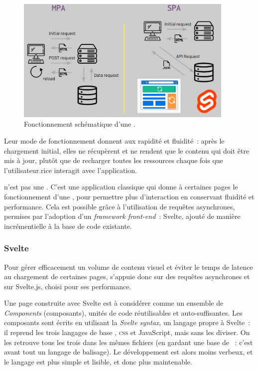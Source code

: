         \begin{figure}[H]
          \begin{center}
          \includegraphics[height=6cm]{figues/SPA.png}
          \end{center}
          \caption{Fonctionnement schématique d'une \spa.}
          \label{fig:spa} \end{figure}

Leur mode de fonctionnement donnent aux \spa rapidité et fluidité~: après
le chargement initial, elles ne récupèrent et ne rendent que le contenu
qui doit être mis à jour, plutôt que de recharger toutes les ressources
chaque fois que l'utilisateur.rice interagit avec l'application.

\aikon n'est pas une \spa. C'est une application classique qui donne à
certaines pages le fonctionnement d'une \spa, pour permettre plus
d'interaction en conservant fluidité et performance. Cela est possible
grâce à l'utilisation de requêtes asynchrones, permises par l'adoption
d'un \textit{framework front-end}~: Svelte, ajouté de manière incrémentielle à la
base de code existante.

\hypertarget{svelte}{%
\subsubsection{Svelte}\label{svelte}}

Pour gérer efficacement un volume de contenu visuel et éviter le temps
de latence au chargement de certaines pages, \aikon s'appuie donc sur des
requêtes asynchrones et sur Svelte.js, choisi pour ses performance.

Une page construite avec Svelte est à considérer comme un ensemble de
\textit{Components} (composants), unités de code réutilisables et
auto-suffisantes. Les composants sont écrits en utilisant la
\emph{Svelte syntax}, un langage propre à Svelte~: il reprend les trois
langages de base \html, \textsc{css} et JavaScript, mais sans les diviser. On les
retrouve tous les trois dans les mêmes fichiers (en gardant une base de
\html~: c'est avant tout un langage de balisage). Le développement est
alors moins verbeux, et le langage est plus simple et lisible, et donc
plus maintenable.

